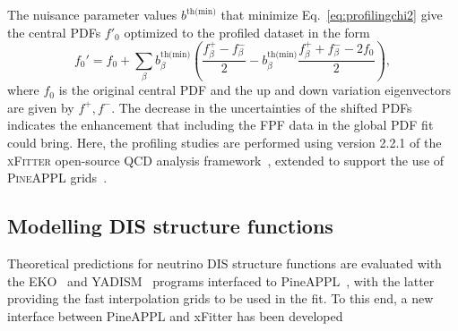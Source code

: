 %
The nuisance parameter values $b^{\textrm{th(min)}}$ that minimize Eq.~\eqref{eq:profilingchi2} give the central PDFs $f'_0$ optimized to the profiled dataset in the form
\begin{equation}
f_0' = f_0
      + \sum_\beta b_\beta^{\textrm{th(min)}} 
        \left(  \frac{f_\beta^+   -  f_\beta^- }{2}
              -    b_\beta^{\textrm{th(min)}}
                \frac{f_\beta^+ + f_\beta^- - 2f_0}{2}
        \right),
\end{equation}
where $f_0$ is the original central PDF and the up and down variation eigenvectors are given by $f^+, f^-$. The decrease in the uncertainties of the shifted PDFs indicates the enhancement that including the FPF data in the global PDF fit could bring. Here, the profiling studies are performed using version 2.2.1 of the \textsc{xFitter} open-source QCD analysis framework~\cite{Alekhin:2014irh, Bertone:2017tig, xFitter:2022zjb, xFitter:web}, extended to support the use of \textsc{PineAPPL} grids~\cite{christopher_schwan_2023_7499507, Carrazza:2020gss}.
%


\subsection{Modelling DIS structure functions}

Theoretical predictions for neutrino DIS structure functions are evaluated with the {\sc\small EKO}~\cite{Candido:2022tld}
and {\sc\small YADISM}~\cite{yadism,Candido:2023utz} programs interfaced to {\sc\small PineAPPL}~\cite{Carrazza:2020gss}, with the latter providing the fast interpolation grids to be used in the fit.
%
To this end, a new interface between  {\sc\small PineAPPL} and {\sc\small xFitter} has been developed
